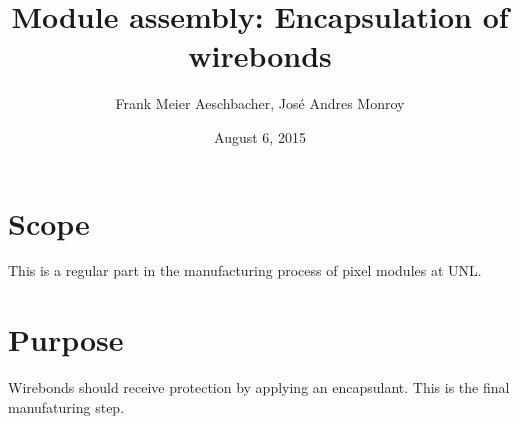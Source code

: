 \documentclass[12pt]{unlsilabsop}
\title{Module assembly: Encapsulation of wirebonds}
\date{August 6, 2015}
\author{Frank Meier Aeschbacher, José Andres Monroy}
\begin{document}
\maketitle

\section{Scope}
This is a regular part in the manufacturing process of pixel modules at UNL.

\section{Purpose}
Wirebonds should receive protection by applying an encapsulant. This is the final manufaturing step.



\end{document}
